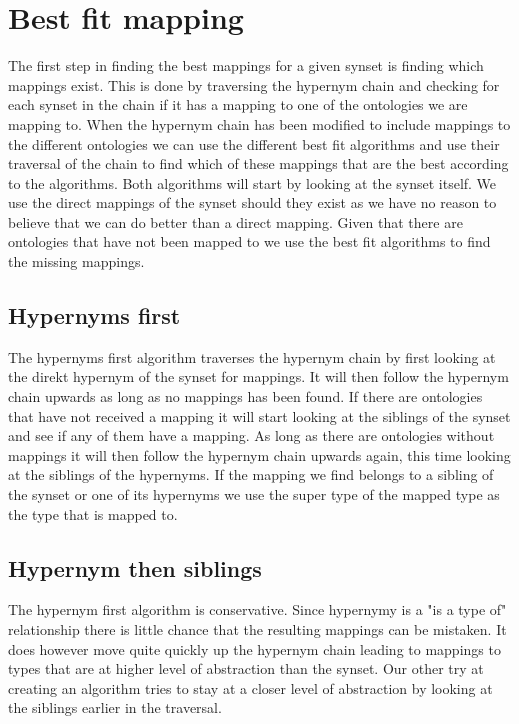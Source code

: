 \section{Best fit mapping}
\label{BestFitMapping}

The first step in finding the best mappings for a given synset is finding which mappings exist.
This is done by traversing the hypernym chain and checking for each synset in the chain if it has a mapping to
one of the ontologies we are mapping to.
When the hypernym chain has been modified to include mappings to the different ontologies we can use the different
best fit algorithms and use their traversal of the chain to find which of these mappings that are the best according to
the algorithms.
Both algorithms will start by looking at the synset itself.
We use the direct mappings of the synset should they exist as we have no reason to believe that we can do better than a
direct mapping.
Given that there are ontologies that have not been mapped to we use the best fit algorithms to find the missing mappings.

\subsection{Hypernyms first}
The hypernyms first algorithm traverses the hypernym chain by first looking at the direkt hypernym of the synset for mappings.
It will then follow the hypernym chain upwards as long as no mappings has been found.
If there are ontologies that have not received a mapping it will start looking at the siblings of the synset and see
if any of them have a mapping.
As long as there are ontologies without mappings it will then follow the hypernym chain upwards again,
this time looking at the siblings of the hypernyms.
If the mapping we find belongs to a sibling of the synset or one of its hypernyms we use the super type of the mapped
type as the type that is mapped to.

\subsection{Hypernym then siblings}
The hypernym first algorithm is conservative.
Since hypernymy is a "is a type of" relationship there is little chance that the resulting mappings can be mistaken.
It does however move quite quickly up the hypernym chain leading to mappings to types that are at higher level
of abstraction than the synset.
Our other try at creating an algorithm tries to stay at a closer level of abstraction by looking at the siblings earlier
in the traversal.

